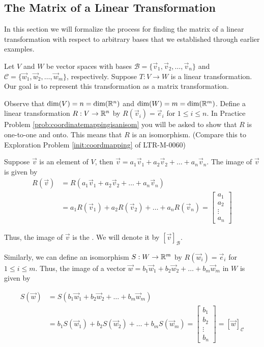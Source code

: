 \documentclass{ximera}
\begin{document}
\subsection{The Matrix of a Linear Transformation}
In this section we will formalize the process for finding the matrix of a linear transformation with respect to arbitrary bases that we established through earlier examples.

Let $V$ and $W$ be vector spaces with bases $\mathcal{B}=\{\vec{v}_1, \vec{v}_2,\ldots ,\vec{v}_n\}$ and $\mathcal{C}=\{\vec{w}_1, \vec{w}_2,\ldots ,\vec{w}_m\}$, respectively.   Suppose $T:V\rightarrow W$ is a linear transformation.  Our goal is to represent this transformation as a matrix transformation.

Observe that $\text{dim}(V)=n=\text{dim}(\mathbb{R}^n)$ and $\text{dim}(W)=m=\text{dim}(\mathbb{R}^m)$. Define a linear transformation $R:V\rightarrow \mathbb{R}^n$ by $R(\vec{v}_i)=\vec{e}_i$ for $1\leq i\leq n$.  In Practice Problem \ref{prob:coordinatemappingisanisom} you will be asked to show that $R$ is one-to-one and onto.  This means that $R$ is an isomorphism.  (Compare this to Exploration Problem \ref{init:coordmapping} of LTR-M-0060)

Suppose $\vec{v}$ is an element of $V$, then $\vec{v}=a_1\vec{v}_1+a_2\vec{v}_2+\ldots +a_n\vec{v}_n$.  The image of $\vec{v}$ is given by
\begin{align*}
R(\vec{v})&=R(a_1\vec{v}_1+a_2\vec{v}_2+\ldots +a_n\vec{v}_n)\\&=a_1R(\vec{v}_1)+a_2R(\vec{v}_2)+\ldots +a_nR(\vec{v}_n)=\begin{bmatrix}a_1\\a_2\\\vdots\\a_n\end{bmatrix}
\end{align*}

Thus, the image of $\vec{v}$ is the . We will denote it by $[\vec{v}]_{\mathcal{B}}$.

Similarly, we can define an isomorphism $S:W\rightarrow \mathbb{R}^m$ by $R(\vec{w}_i)=\vec{e}_i$ for $1\leq i\leq m$. Thus, the image of a vector $\vec{w}=b_1\vec{w}_1+b_2\vec{w}_2+\ldots +b_m\vec{w}_m$ in $W$ is given by

\begin{align*}
S(\vec{w})&=S(b_1\vec{w}_1+b_2\vec{w}_2+\ldots +b_m\vec{w}_m)\\&=b_1S(\vec{w}_1)+b_2S(\vec{w}_2)+\ldots +b_mS(\vec{w}_m)=\begin{bmatrix}b_1\\b_2\\\vdots\\b_n\end{bmatrix}=[\vec{w}]_{\mathcal{C}}
\end{align*}
\end{document}
